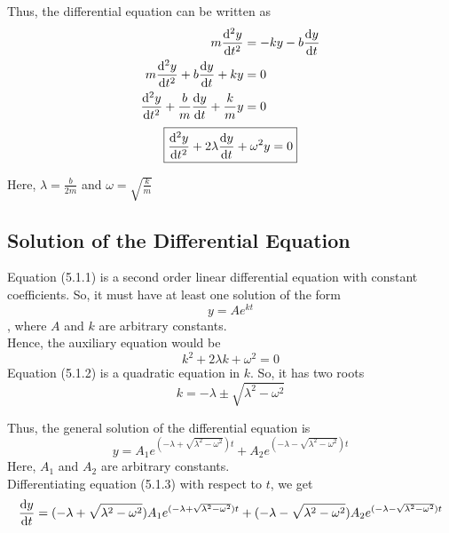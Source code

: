 \documentclass[12pt]{article}
\numberwithin{equation}{subsection}
\begin{document}
Thus, the differential equation can be written as
\begin{align*}
    m \dv[2]{y}{t} &= -ky -b\dv{y}{t} \\
    m \dv[2]{y}{t} + b\dv{y}{t} + ky &= 0 \\
    \dv[2]{y}{t} + \frac{b}{m}\dv{y}{t} + \frac{k}{m}y &= 0
\end{align*}
\begin{equation}
    \boxed{ \dv[2]{y}{t} + 2\lambda \dv{y}{t} + \omega^2 y = 0 }
\end{equation}

Here, $\displaystyle \lambda = \frac{b}{2m}$ and $\displaystyle \omega = \sqrt{\frac{k}{m}}$ \\



\subsection{Solution of the Differential Equation}
Equation (5.1.1) is a second order linear differential equation with constant coefficients. So, it must have at least one solution of the form \[
    y = A e^{kt}
\]
, where $A$ and $k$ are arbitrary constants.\\
Hence, the auxiliary equation would be
\begin{equation}
    k^2 + 2\lambda k + \omega^2 = 0
\end{equation}
Equation (5.1.2) is a quadratic equation in $k$. So, it has two roots \[
    k = -\lambda \pm \sqrt{\lambda^2 - \omega^2}
\]

Thus, the general solution of the differential equation is
\begin{equation}
    \boxed{ y = A_1 e^{(-\lambda + \sqrt{\lambda^2 - \omega^2})t} + A_2 e^{(-\lambda - \sqrt{\lambda^2 - \omega^2})t} }
\end{equation}
Here, $A_1$ and $A_2$ are arbitrary constants. \\
Differentiating equation (5.1.3) with respect to $t$, we get
\begin{equation}
    \dv{y}{t} = (-\lambda + \sqrt{\lambda^2 - \omega^2})A_1 e^{(-\lambda + \sqrt{\lambda^2 - \omega^2})t} + (-\lambda - \sqrt{\lambda^2 - \omega^2})A_2 e^{(-\lambda - \sqrt{\lambda^2 - \omega^2})t}
\end{equation}
\end{document}
